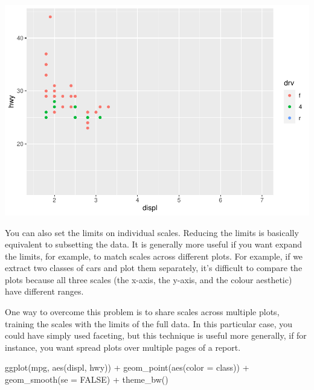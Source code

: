 \documentclass[
]{article}
\newenvironment{Shaded}{\begin{snugshade}}{\end{snugshade}}
\newcommand{\AttributeTok}[1]{\textcolor[rgb]{0.77,0.63,0.00}{#1}}
\newcommand{\ConstantTok}[1]{\textcolor[rgb]{0.00,0.00,0.00}{#1}}
\newcommand{\FunctionTok}[1]{\textcolor[rgb]{0.00,0.00,0.00}{#1}}
\newcommand{\NormalTok}[1]{#1}
\newcommand{\SpecialCharTok}[1]{\textcolor[rgb]{0.00,0.00,0.00}{#1}}
\begin{document}
\includegraphics{Journal_files/figure-latex/unnamed-chunk-61-6.pdf}

You can also set the limits on individual scales. Reducing the limits is
basically equivalent to subsetting the data. It is generally more useful
if you want expand the limits, for example, to match scales across
different plots. For example, if we extract two classes of cars and plot
them separately, it's difficult to compare the plots because all three
scales (the x-axis, the y-axis, and the colour aesthetic) have different
ranges.

One way to overcome this problem is to share scales across multiple
plots, training the scales with the limits of the full data. In this
particular case, you could have simply used faceting, but this technique
is useful more generally, if for instance, you want spread plots over
multiple pages of a report.

\begin{Shaded}
\begin{Highlighting}[]
\FunctionTok{ggplot}\NormalTok{(mpg, }\FunctionTok{aes}\NormalTok{(displ, hwy)) }\SpecialCharTok{+}
  \FunctionTok{geom\_point}\NormalTok{(}\FunctionTok{aes}\NormalTok{(}\AttributeTok{color =}\NormalTok{ class)) }\SpecialCharTok{+}
  \FunctionTok{geom\_smooth}\NormalTok{(}\AttributeTok{se =} \ConstantTok{FALSE}\NormalTok{) }\SpecialCharTok{+}
  \FunctionTok{theme\_bw}\NormalTok{()}
\end{Highlighting}
\end{Shaded}
\end{document}

